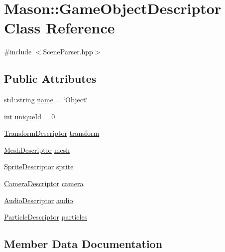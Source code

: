 \hypertarget{class_mason_1_1_game_object_descriptor}{}\section{Mason\+:\+:Game\+Object\+Descriptor Class Reference}
\label{class_mason_1_1_game_object_descriptor}


{\ttfamily \#include $<$Scene\+Parser.\+hpp$>$}

\subsection*{Public Attributes}
\begin{DoxyCompactItemize}
\item 
std\+::string \hyperlink{class_mason_1_1_game_object_descriptor_aea3fddf12ef08c91e1f5e422c7521e18}{name} = \char`\"{}Object\char`\"{}
\item 
int \hyperlink{class_mason_1_1_game_object_descriptor_aafbd17cd506939c46ce70b550762e2d1}{unique\+Id} = 0
\item 
\hyperlink{class_mason_1_1_transform_descriptor}{Transform\+Descriptor} \hyperlink{class_mason_1_1_game_object_descriptor_aa22b35eef207a8451a3ad6b816ecd5ac}{transform}
\item 
\hyperlink{class_mason_1_1_mesh_descriptor}{Mesh\+Descriptor} \hyperlink{class_mason_1_1_game_object_descriptor_aa35f5149d8d6fe9670f6b3bac1c9d0a2}{mesh}
\item 
\hyperlink{class_mason_1_1_sprite_descriptor}{Sprite\+Descriptor} \hyperlink{class_mason_1_1_game_object_descriptor_aa7e89568fa330d9337093a73b63f2d3e}{sprite}
\item 
\hyperlink{class_mason_1_1_camera_descriptor}{Camera\+Descriptor} \hyperlink{class_mason_1_1_game_object_descriptor_a9b2710a89f6a1bb223594a2762340414}{camera}
\item 
\hyperlink{class_mason_1_1_audio_descriptor}{Audio\+Descriptor} \hyperlink{class_mason_1_1_game_object_descriptor_a121843bc6264f0828e8672b1b390b21b}{audio}
\item 
\hyperlink{class_mason_1_1_particle_descriptor}{Particle\+Descriptor} \hyperlink{class_mason_1_1_game_object_descriptor_aa51c7f6f6a4cb0720c352cd504d4593c}{particles}
\end{DoxyCompactItemize}


\subsection{Member Data Documentation}
\hypertarget{class_mason_1_1_game_object_descriptor_a121843bc6264f0828e8672b1b390b21b}{}\label{class_mason_1_1_game_object_descriptor_a121843bc6264f0828e8672b1b390b21b} 
